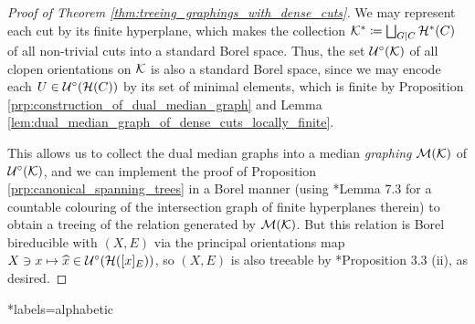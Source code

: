 \documentclass[reqno]{amsart}
\begin{document}
    \begin{proof}[Proof of Theorem \ref{thm:treeing_graphings_with_dense_cuts}]
        We may represent each cut by its finite hyperplane, which makes the collection $\mathcal{K}^\ast\coloneqq\bigsqcup_{G|C}\mathcal{H}^\ast(C)$ of all non-trivial cuts into a standard Borel space. Thus, the set $\mathcal{U}^\circ(\mathcal{K})$ of all clopen orientations on $\mathcal{K}$ is also a standard Borel space, since we may encode each $U\in\mathcal{U}^\circ(\mathcal{H}(C))$ by its set of minimal elements, which is finite by Proposition \ref{prp:construction_of_dual_median_graph} and Lemma \ref{lem:dual_median_graph_of_dense_cuts_locally_finite}.

        This allows us to collect the dual median graphs into a median \textit{graphing} $\mathcal{M}(\mathcal{K})$ of $\mathcal{U}^\circ(\mathcal{K})$, and we can implement the proof of Proposition \ref{prp:canonical_spanning_trees} in a Borel manner (using \cite{KM04}*{Lemma 7.3} for a countable colouring of the intersection graph of finite hyperplanes therein) to obtain a treeing of the relation generated by $\mathcal{M}(\mathcal{K})$. But this relation is Borel bireducible with $(X,E)$ via the principal orientations map $X\ni x\mapsto\widehat{x}\in\mathcal{U}^\circ(\mathcal{H}([x]_E))$, so $(X,E)$ is also treeable by \cite{JKL02}*{Proposition 3.3 (ii)}, as desired.
    \end{proof}

    \begin{bibdiv}
        \begin{biblist}*{labels={alphabetic}}
        \end{biblist}
    \end{bibdiv}
\end{document}
